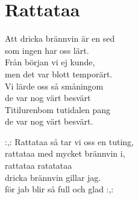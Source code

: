 \section{Rattataa}
Att dricka brännvin är en sed\\
som ingen har oss lärt.\\
Från början vi ej kunde,\\
men det var blott temporärt.\\
Vi lärde oss så småningom\\
de var nog värt besvärt\\
Titilurenbom tutidalen pang\\
de var nog värt besvärt.

:,: Rattataa så tar vi oss en tuting,\\
rattataa med mycket brännvin i,\\
rattataa ratatataa\\
dricka brännvin gillar jag.\\
för jab blir så full och glad :,: